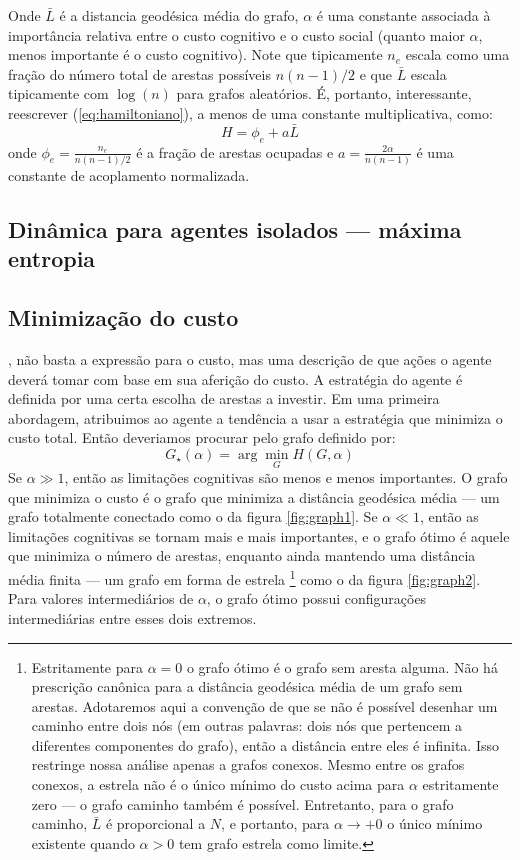 Onde $\bar{L}$ é a distancia geodésica média do grafo, $\alpha$ é uma constante associada à importância relativa entre o custo cognitivo e o custo social (quanto maior $\alpha$, menos importante é o custo cognitivo). Note que tipicamente $n_{e}$ escala como uma fração do número total de arestas possíveis $n(n-1)/2$ e que $\bar{L}$ escala tipicamente com $\log(n)$ para grafos aleatórios. É, portanto, interessante, reescrever (\ref{eq:hamiltoniano}), a menos de uma constante multiplicativa, como:
\begin{equation}
   \label{eq:hamiltoniano2}
   H = \phi_{e}  + a \bar{L}
\end{equation}
onde $\phi_{e} = \frac{n_{e}}{n(n-1)/2}$ é a fração de arestas ocupadas e $a = \frac{2\alpha}{n(n-1)}$ é uma constante de acoplamento normalizada. 

\subsection{Dinâmica para agentes isolados --- máxima entropia}
\subsection{Minimização do custo}
\label{sec:mincusto}
, não basta a expressão para o custo, mas uma descrição de que ações o agente deverá tomar com base em sua aferição do custo. A estratégia do agente é definida por uma certa escolha de arestas a investir. Em uma primeira abordagem, atribuimos ao agente a tendência a usar a estratégia que minimiza o custo total. Então deveriamos procurar pelo grafo definido por:
\begin{equation}
\label{eq:minimize}
  G_{\star}(\alpha) = \arg\min_{G} H(G,\alpha)
\end{equation}
Se $\alpha \gg 1$, então as limitações cognitivas são menos e menos importantes. O grafo que minimiza o custo é o grafo que minimiza a distância geodésica média --- um grafo totalmente conectado como o da figura \ref{fig:graph1}. Se \(\alpha \ll 1\), então as limitações cognitivas se tornam mais e mais importantes, e o grafo ótimo é aquele que minimiza o número de arestas, enquanto ainda mantendo uma distância média finita --- um grafo em forma de estrela \footnote[][-3cm]{Estritamente para \(\alpha = 0\) o grafo ótimo é o grafo sem aresta alguma. Não há prescrição canônica para a distância geodésica média de um grafo sem arestas. Adotaremos aqui a convenção de que se não é possível desenhar um caminho entre dois nós (em outras palavras: dois nós que pertencem a diferentes componentes do grafo), então a distância entre eles é infinita. Isso restringe nossa análise apenas a grafos conexos. Mesmo entre os grafos conexos, a estrela não é o único mínimo do custo acima para \(\alpha\) estritamente zero --- o grafo caminho 
também é possível. Entretanto, para o grafo caminho, \(\bar{L}\) é proporcional a \(N\), e portanto, para $\alpha \to +0$ o único mínimo existente quando $\alpha > 0$ tem grafo estrela como limite. } como o da figura \ref{fig:graph2}. Para valores intermediários de \(\alpha\), o grafo ótimo possui configurações intermediárias entre esses dois extremos. 

